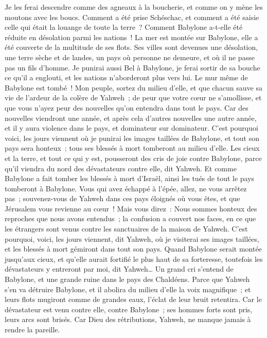 \begin{multicols}{2}
Je les ferai descendre comme des agneaux à la boucherie, et comme on y mène les moutons avec les boucs.
Comment a été prise Schéschac, et comment a été saisie celle qui était la louange de toute la terre~? Comment Babylone a-t-elle été réduite en désolation parmi les nations~!
La mer est montée sur Babylone, elle a été couverte de la multitude de ses flots.
Ses villes sont devenues une désolation, une terre sèche et de landes, un pays où personne ne demeure, et où il ne passe pas un fils d'homme.
Je punirai aussi Bel à Babylone, je ferai sortir de sa bouche ce qu'il a englouti, et les nations n'aborderont plus vers lui. Le mur même de Babylone est tombé~!
Mon peuple, sortez du milieu d'elle, et que chacun sauve sa vie de l'ardeur de la colère de Yahweh~;
de peur que votre cœur ne s'amollisse, et que vous n'ayez peur des nouvelles qu'on entendra dans tout le pays. Car des nouvelles viendront une année, et après cela d'autres nouvelles une autre année, et il y aura violence dans le pays, et dominateur sur dominateur.
C'est pourquoi voici, les jours viennent où je punirai les images taillées de Babylone, et tout son pays sera honteux~; tous ses blessés à mort tomberont au milieu d'elle.
Les cieux et la terre, et tout ce qui y est, pousseront des cris de joie contre Babylone, parce qu'il viendra du nord des dévastateurs contre elle, dit Yahweh.
Et comme Babylone a fait tomber les blessés à mort d'Israël, ainsi les tués de tout le pays tomberont à Babylone.
Vous qui avez échappé à l'épée, allez, ne vous arrêtez pas~; souvenez-vous de Yahweh dans ces pays éloignés où vous êtes, et que Jérusalem vous revienne au cœur~!
Mais vous direz~: Nous sommes honteux des reproches que nous avons entendus~; la confusion a couvert nos faces, en ce que les étrangers sont venus contre les sanctuaires de la maison de Yahweh.
C'est pourquoi, voici, les jours viennent, dit Yahweh, où je visiterai ses images taillées, et les blessés à mort gémiront dans tout son pays.
Quand Babylone serait montée jusqu'aux cieux, et qu'elle aurait fortifié le plus haut de sa forteresse, toutefois les dévastateurs y entreront par moi, dit Yahweh…
Un grand cri s'entend de Babylone, et une grande ruine dans le pays des Chaldéens.
Parce que Yahweh s'en va détruire Babylone, et il abolira du milieu d'elle la voix magnifique~; et leurs flots mugiront comme de grandes eaux, l'éclat de leur bruit retentira.
Car le dévastateur est venu contre elle, contre Babylone~; ses hommes forts sont pris, leurs arcs sont brisés. Car Dieu des rétributions, Yahweh, ne manque jamais à rendre la pareille.

\end{multicols}
